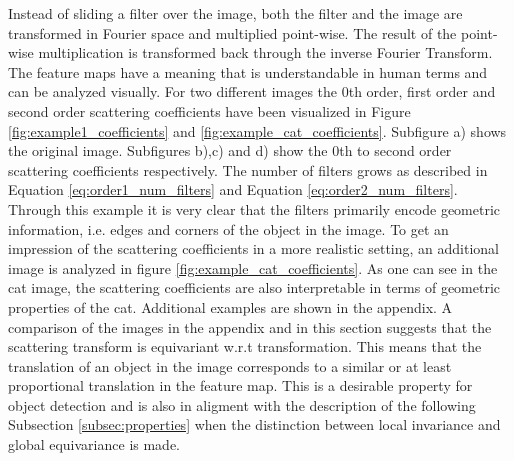 Instead of sliding a filter over the image, both the filter and the image are transformed in Fourier space and multiplied point-wise. The result of the point-wise multiplication is transformed back through the inverse Fourier Transform. The feature maps have a meaning that is understandable in human terms and can be analyzed visually. For two different images the 0th order, first order and second order scattering coefficients have been visualized in Figure \ref{fig:example1_coefficients} and \ref{fig:example_cat_coefficients}. Subfigure a) shows the original image. Subfigures b),c) and d) show the 0th to second order scattering coefficients respectively. The number of filters grows as described in Equation \ref{eq:order1_num_filters} and Equation \ref{eq:order2_num_filters}. Through this example it is very clear that the filters primarily encode geometric information, i.e. edges and corners of the object in the image. To get an  impression of the scattering coefficients in a more realistic setting, an additional image is analyzed in figure \ref{fig:example_cat_coefficients}. As one can see in the cat image, the scattering coefficients are also interpretable in terms of geometric properties of the cat. Additional examples are shown in the appendix. A comparison of the images in the appendix and in this section suggests that the scattering transform is equivariant w.r.t transformation. This means that the translation of an object in the image corresponds to a similar or at least proportional translation in the feature map. This is a desirable property for object detection and is also in aligment with the description of the following Subsection \ref{subsec:properties} when the distinction between local invariance and global equivariance is made. 

\fboxsep=0mm%
\fboxrule=1pt%

